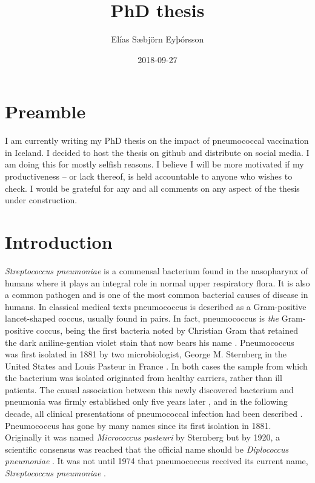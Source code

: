 \documentclass[]{book}
\title{PhD thesis}
\author{Elías Sæbjörn Eyþórsson}
\date{2018-09-27}
\theoremstyle{definition}
\theoremstyle{definition}
\theoremstyle{definition}
\theoremstyle{remark}
\begin{document}
\maketitle

{
\setcounter{tocdepth}{1}
\tableofcontents
}
\chapter{Preamble}\label{preamble}

I am currently writing my PhD thesis on the impact of pneumococcal
vaccination in Iceland. I decided to host the thesis on github and
distribute on social media. I am doing this for mostly selfish reasons.
I believe I will be more motivated if my productiveness -- or lack
thereof, is held accountable to anyone who wishes to check. I would be
grateful for any and all comments on any aspect of the thesis under
construction.

\chapter{Introduction}\label{intro}

\emph{Streptococcus pneumoniae} is a commensal bacterium found in the
nasopharynx of humans where it plays an integral role in normal upper
respiratory flora. It is also a common pathogen and is one of the most
common bacterial causes of disease in humans. In classical medical texts
pneumococcus is described as a Gram-positive lancet-shaped coccus,
usually found in pairs. In fact, pneumococcus is \emph{the}
Gram-positive coccus, being the first bacteria noted by Christian Gram
that retained the dark aniline-gentian violet stain that now bears his
name \citep{Gram1884}. Pneumococcus was first isolated in 1881 by two
microbiologist, George M. Sternberg in the United States and Louis
Pasteur in France \citep{Pasteur1881, Sternberg1881, Watson1993}. In
both cases the sample from which the bacterium was isolated originated
from healthy carriers, rather than ill patients. The causal association
between this newly discovered bacterium and pneumonia was firmly
established only five years later \citep{Weichselbaum1886}, and in the
following decade, all clinical presentations of pneumococcal infection
had been described \citep{Austrian1981}. Pneumococcus has gone by many
names since its first isolation in 1881. Originally it was named
\emph{Micrococcus pasteuri} by Sternberg \citep{Sternberg1881} but by
1920, a scientific consensus was reached that the official name should
be \emph{Diplococcus pneumoniae} \citep{Winslow1920}. It was not until
1974 that pneumococcus received its current name, \emph{Streptococcus
pneumoniae} \citep{Deibel1974}.
\end{document}
